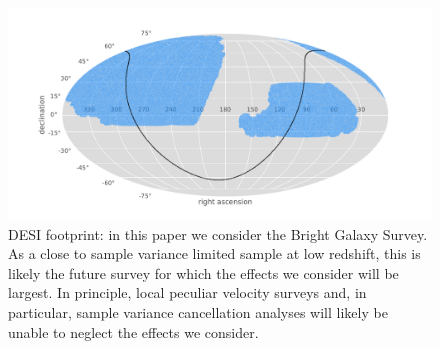 \documentclass[useAMS,usenatbib]{mn2e}
\begin{document}
\begin{figure}
    \centering
    \includegraphics[scale=0.75]{footprint.pdf}
    \caption{DESI footprint: in this paper we consider the Bright Galaxy Survey.  As a close to sample variance limited sample at low redshift, this is likely the future survey for which the effects we consider will be largest.  In principle, local peculiar velocity surveys and, in particular, sample variance cancellation analyses will likely be unable to neglect the effects we consider.}
    \label{fig:footprint}
\end{figure}
\end{document}
